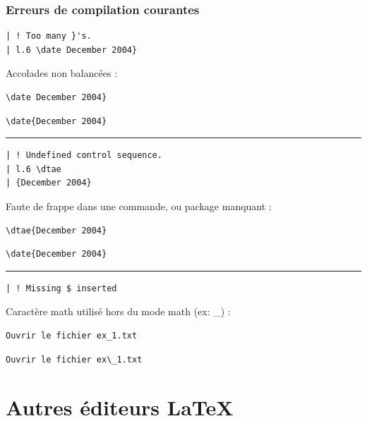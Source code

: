 \documentclass{beamer}
\begin{document}
\begin{frame}[fragile]
  \frametitle{Erreurs de compilation courantes}

\begin{lstlisting}[language={},backgroundcolor=\color{gray!30}]
| ! Too many }'s.
| l.6 \date December 2004}
\end{lstlisting}
Accolades non balancées :
\begin{lstlisting}[backgroundcolor=\color{red!20}]
\date December 2004}
\end{lstlisting}\vspace*{-.85em}
\begin{lstlisting}[backgroundcolor=\color{green!20}]
\date{December 2004}
\end{lstlisting}

\pause
\hrule
\medskip
\begin{lstlisting}[language={},backgroundcolor=\color{gray!30}]
| ! Undefined control sequence.
| l.6 \dtae
| {December 2004}
\end{lstlisting}
Faute de frappe dans une commande, ou package manquant :
\begin{lstlisting}[backgroundcolor=\color{red!20}]
\dtae{December 2004}
\end{lstlisting}\vspace*{-.85em}
\begin{lstlisting}[backgroundcolor=\color{green!20}]
\date{December 2004}
\end{lstlisting}

\pause
\hrule
\medskip
\begin{lstlisting}[language={},backgroundcolor=\color{gray!30}]
| ! Missing $ inserted
\end{lstlisting}
Caractère math utilisé hors du mode math (ex: \_) :
\begin{lstlisting}[backgroundcolor=\color{red!20}]
Ouvrir le fichier ex_1.txt
\end{lstlisting}\vspace*{-.85em}
\begin{lstlisting}[backgroundcolor=\color{green!20}]
Ouvrir le fichier ex\_1.txt
\end{lstlisting}

\end{frame}


\section{Autres éditeurs \LaTeX}
\end{document}
